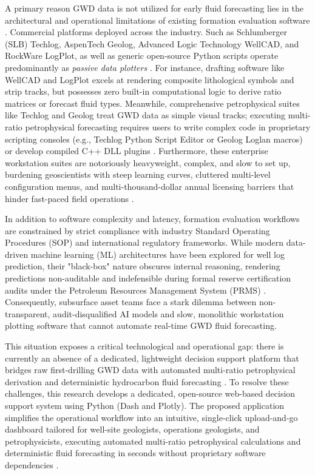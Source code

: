 A primary reason GWD data is not utilized for early fluid forecasting lies in the architectural and operational limitations of existing formation evaluation software \citep{ref8, wood2020}. Commercial platforms deployed across the industry. Such as Schlumberger (SLB) Techlog, AspenTech Geolog, Advanced Logic Technology WellCAD, and RockWare LogPlot, as well as generic open-source Python scripts operate predominantly as \textit{passive data plotters} \citep{wood2020}. For instance, drafting software like WellCAD and LogPlot excels at rendering composite lithological symbols and strip tracks, but possesses zero built-in computational logic to derive ratio matrices or forecast fluid types. Meanwhile, comprehensive petrophysical suites like Techlog and Geolog treat GWD data as simple visual tracks; executing multi-ratio petrophysical forecasting requires users to write complex code in proprietary scripting consoles (e.g., Techlog Python Script Editor or Geolog Loglan macros) or develop compiled C++ DLL plugins \citep{wood2020}. Furthermore, these enterprise workstation suites are notoriously heavyweight, complex, and slow to set up, burdening geoscientists with steep learning curves, cluttered multi-level configuration menus, and multi-thousand-dollar annual licensing barriers that hinder fast-paced field operations \citep{ref8, wood2020}.

In addition to software complexity and latency, formation evaluation workflows are constrained by strict compliance with industry Standard Operating Procedures (SOP) and international regulatory frameworks. While modern data-driven machine learning (ML) architectures have been explored for well log prediction, their "black-box" nature obscures internal reasoning, rendering predictions non-auditable and indefensible during formal reserve certification audits under the \citet{ref3} Petroleum Resources Management System (PRMS) \citep{ref1, ref3}. Consequently, subsurface asset teams face a stark dilemma between non-transparent, audit-disqualified AI models and slow, monolithic workstation plotting software that cannot automate real-time GWD fluid forecasting.

This situation exposes a critical technological and operational gap: there is currently an absence of a dedicated, lightweight decision support platform that bridges raw first-drilling GWD data with automated multi-ratio petrophysical derivation and deterministic hydrocarbon fluid forecasting \citep{ref8, wood2020}. To resolve these challenges, this research develops a dedicated, open-source web-based decision support system using Python (Dash and Plotly). The proposed application simplifies the operational workflow into an intuitive, single-click upload-and-go dashboard tailored for well-site geologists, operations geologists, and petrophysicists, executing automated multi-ratio petrophysical calculations and deterministic fluid forecasting in seconds without proprietary software dependencies \citep{ref3, ref8, ref11, ref12}.

